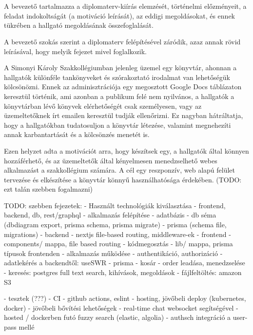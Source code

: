 \chapter{\bevezetes}

A bevezető tartalmazza a diplomaterv-kiírás elemzését, történelmi előzményeit, a feladat indokoltságát (a motiváció leírását), az eddigi megoldásokat, és ennek tükrében a hallgató megoldásának összefoglalását.

A bevezető szokás szerint a diplomaterv felépítésével záródik, azaz annak rövid leírásával, hogy melyik fejezet mivel foglalkozik.

A Simonyi Károly Szakkollégiumban jelenleg üzemel egy könyvtár, ahonnan a hallgatók különféle tankönyveket és szórakoztató irodalmat van lehetőségük kölcsönözni.
Ennek az adminisztrációja egy megosztott Google Docs táblázaton keresztül történik, ami azonban a publikum felé nem nyilvános, a hallgatók a könyvtárban lévő könyvek elérhetőségét csak személyesen,
vagy az üzemeltetőknek írt emailen keresztül tudják ellenőrizni. Ez nagyban hátráltatja, hogy a hallgatókban tudatosuljon a könyvtár létezése, valamint  megnehezíti annak karbantartását és a kölcsönzés menetét is.

Ezen helyzet adta a motivációt arra, hogy készítsek egy, a hallgatók által könnyen hozzáférhető, és az üzemeltetők által kényelmesen menedzselhető webes alkalmazást a szakkollégium számára.
A cél egy reszponzív, web alapú felület tervezése és elkészítése a könyvtár könnyű használhatósága érdekében. (TODO: ezt talán szebben fogalmazni)

TODO: szebben
fejezetek:
- Használt technológiák kiválasztása
  - frontend, backend, db, rest/graphql
- alkalmazás felépítése
  - adatbázis
    - db séma (dbdiagram export, prisma schema, prisma migrate)
    - prisma (schema file, migrations)
  - backend
    - nextjs file-based routing, middleware-ek
  - frontend
    - components/ mappa, file based routing
  - kódmegosztás
    - lib/ mappa, prisma típusok frontenden
- alkalmazás működése
  - authentikáció, authorizáció
  - adatlekérés a backendtől: useSWR
  - prisma
  - kosár
  - order leadása, menedzselése
  - keresés: postgres full text search, kihívások, megoldások
  - fájlfeltöltés: amazon S3

- tesztek (???)
- CI
  - github actions, eslint
- hosting, jövőbeli deploy (kubernetes, docker)
- jövőbeli bővítési lehetőségek
  - real-time chat websocket segítségével
  - hosted / dockerben futó fuzzy search (elastic, algolia)
  - authsch integráció a user-pass mellé

